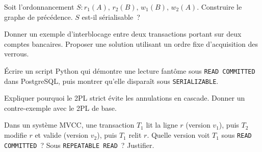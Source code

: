 \begin{exercice}
Soit l'ordonnancement $S : r_1(A),\, r_2(B),\, w_1(B),\, w_2(A)$.
Construire le graphe de pr\'ec\'edence. $S$ est-il s\'erialisable~?
\end{exercice}

\begin{exercice}
Donner un exemple d'interblocage entre deux transactions portant sur
deux comptes bancaires. Proposer une solution utilisant un ordre fixe
d'acquisition des verrous.
\end{exercice}

\begin{exercice}
\'Ecrire un script Python qui d\'emontre une lecture fant\^ome sous
\texttt{READ COMMITTED} dans PostgreSQL, puis montrer qu'elle dispara\^it
sous \texttt{SERIALIZABLE}.
\end{exercice}

\begin{exercice}
Expliquer pourquoi le 2PL strict \'evite les annulations en cascade.
Donner un contre-exemple avec le 2PL de base.
\end{exercice}

\begin{exercice}
Dans un syst\`eme MVCC, une transaction $T_1$ lit la ligne $r$ (version $v_1$),
puis $T_2$ modifie $r$ et valide (version $v_2$), puis $T_1$ relit $r$.
Quelle version voit $T_1$ sous \texttt{READ COMMITTED}~? Sous
\texttt{REPEATABLE READ}~? Justifier.
\end{exercice}
